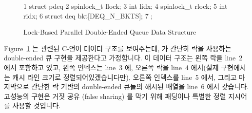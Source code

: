 \begin{figure}[tbp]
{ \scriptsize
\begin{verbbox}
  1 struct pdeq {
  2   spinlock_t llock;
  3   int lidx;
  4   spinlock_t rlock;
  5   int ridx;
  6   struct deq bkt[DEQ_N_BKTS];
  7 };
\end{verbbox}
}
\centering
\theverbbox
\caption{Lock-Based Parallel Double-Ended Queue Data Structure}
\label{fig:SMPdesign:Lock-Based Parallel Double-Ended Queue Data Structure}
\end{figure}

Figure~\ref{fig:SMPdesign:Lock-Based Parallel Double-Ended Queue Data Structure}
는 관련된 C-언어 데이터 구조를 보여주는데,  가 간단히 락을
사용하는 double-ended 큐 구현을 제공한다고 가정합니다.
이 데이터 구조는 왼쪽 락을 line~2 에서 포함하고 있고, 왼쪽 인덱스는 line~3 에,
오른쪽 락을 line~4 에서(실제 구현에서는 캐시 라인 크기로 정렬되어있겠습니다만),
오른쪽 인덱스를 line~5 에서, 그리고 마지막으로 간단한 락 기반의 double-ended
큐들의 해시된 배열을 line~6 에서 갖습니다.
고성능의 구현은 거짓 공유 (false sharing) 를 막기 위해 패딩이나 특별한 정렬
지시어를 사용할 것입니다.

